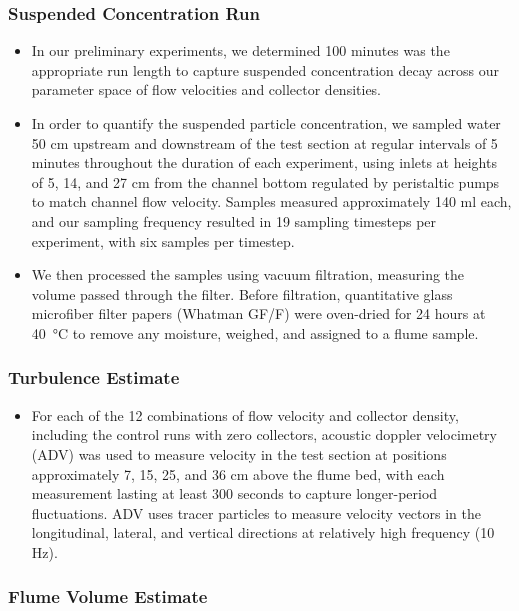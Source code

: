 \documentclass{article}
\begin{document}
\subsubsection{Suspended Concentration Run}

\begin{itemize}
    \item In our preliminary experiments, we determined 100 minutes was the appropriate run length to capture suspended concentration decay across our parameter space of flow velocities and collector densities.
    \item In order to quantify the suspended particle concentration, we sampled water 50 cm upstream and downstream of the test section at regular intervals of 5 minutes throughout the duration of each experiment, using inlets at heights of 5, 14, and 27 cm from the channel bottom regulated by peristaltic pumps to match channel flow velocity. Samples measured approximately 140 ml each, and our sampling frequency resulted in 19 sampling timesteps per experiment, with six samples per timestep.
    \item We then processed the samples using vacuum filtration, measuring the volume passed through the filter. Before filtration, quantitative glass microfiber filter papers (Whatman GF/F) were oven-dried for 24 hours at \SI{40}{\celsius} to remove any moisture, weighed, and assigned to a flume sample.
\end{itemize}

\subsubsection{Turbulence Estimate}

\begin{itemize}
    \item For each of the 12 combinations of flow velocity and collector density, including the control runs with zero collectors, acoustic doppler velocimetry (ADV) was used to measure velocity in the test section at positions approximately 7, 15, 25, and 36 cm above the flume bed, with each measurement lasting at least 300 seconds to capture longer-period fluctuations. ADV uses tracer particles to measure velocity vectors in the longitudinal, lateral, and vertical directions at relatively high frequency (10 Hz).
\end{itemize}

\subsubsection{Flume Volume Estimate}
\end{document}
